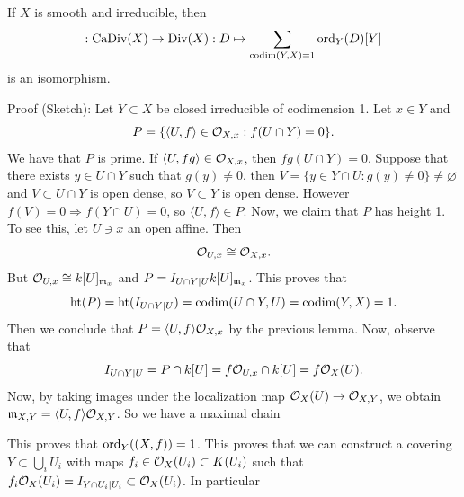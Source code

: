 \begin{dang}
    \begin{theorem}
        If $X$ is smooth and irreducible, then 
        \begin{equation}
            [\;]:\CaDiv(X)\to \Div(X):D\mapsto \sum_{\codim(Y,X)=1} \ord_Y(D)[Y]
        \end{equation}
        is an isomorphism.
    \end{theorem}
\end{dang}
Proof (Sketch): Let $Y\subset X$ be closed irreducible of codimension 1. Let $x\in Y$ and 
\begin{equation}
    P = \{\langle U,f\rangle \in\mathcal{O}_{X,x}: f(U\cap Y)=0\}.
\end{equation}
We have that $P$ is prime. If $\langle U,fg\rangle\in\mathcal{O}_{X,x}$, then 
$fg(U\cap Y)=0$. Suppose that there exists $y\in U\cap Y$ such that $g(y)\neq0$, then 
$V=\{y\in Y\cap U: g(y)\neq0\}\neq\varnothing$ and $V\subset U\cap Y$ is open dense, so $V\subset Y$ 
is open dense. However $f(V) = 0 \Rightarrow f(Y\cap U)=0$, so $\langle U,f\rangle \in P$. 
Now, we claim that $P$ has height 1. To see this, let $U\ni x$ an open affine. Then 
\begin{equation}
    \mathcal{O}_{U,x}\cong\mathcal{O}_{X,x}.
\end{equation}
But $\mathcal{O}_{U,x}\cong k[U]_{\mathfrak{m}_x}$ and $P = I_{U\cap Y|U}k[U]_{\mathfrak{m}_x}$. This proves that 
\begin{equation}
    \text{ht}(P) = \text{ht}(I_{U\cap Y| U}) =\text{codim}(U\cap Y, U) = \text{codim}(Y,X)=1.
\end{equation}
Then we conclude that $P=\langle U,f\rangle\mathcal{O}_{X,x}$ by the previous lemma. Now, observe that 
\begin{equation}
    I_{U\cap Y|U} =  P\cap k[U] = f\mathcal{O}_{U,x} \cap k[U] = f\mathcal{O}_X(U).
\end{equation}
Now, by taking images under the localization map $\mathcal{O}_X(U)\to \mathcal{O}_{X,Y}$, we obtain 
$\mathfrak{m}_{X,Y} = \langle U,f\rangle\mathcal{O}_{X,Y}$. So we have a maximal chain 
\begin{center}
\end{center}
This proves that $\text{ord}_Y((X,f))=1$. This proves that we can construct a covering $Y\subset \bigcup_i U_i$
with maps $f_i\in \mathcal{O}_X(U_i)\subset K(U_i)$ such that $f_i\mathcal{O}_X(U_i) = I_{Y\cap U_i|U_i}\subset\mathcal{O}_X(U_i)$. In particular 
